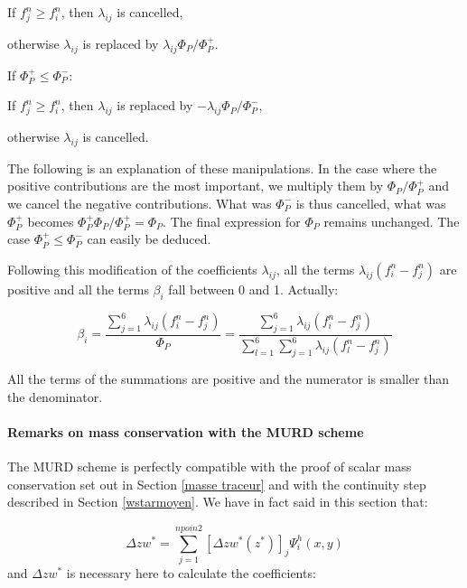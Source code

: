\qquad If $f_{j}^{n}\geq f_{i}^{n}$, then $\lambda_{ij}$ is cancelled,

\qquad otherwise $\lambda_{ij}$ is replaced by $\lambda_{ij}\Phi_{P}/\Phi_{P}^{+}$.

If $\Phi_{P}^{+}\leq\Phi_{P}^{-}$:

\qquad If $f_{j}^{n}\geq f_{i}^{n}$, then $\lambda_{ij}$ is replaced by
$-\lambda_{ij}\Phi_{P}/\Phi_{P}^{-}$,

\qquad otherwise $\lambda_{ij}$ is cancelled.

The following is an explanation of these manipulations. In the case where the
positive contributions are the most important, we multiply them by $\Phi_{P}/\Phi_{P}^{+}$
and we cancel the negative contributions. What was $\Phi_{P}^{-}$ is thus cancelled,
what was $\Phi_{P}^{+}$ becomes $\Phi _{P}^{+}\Phi_{P}/\Phi_{P}^{+}=\Phi_{P}$. The final expression for
$\Phi_{P}$ remains unchanged. The case $\Phi_{P}^{+}\leq\Phi_{P}^{-}$ can
easily be deduced.

Following this modification of the coefficients $\lambda_{ij}$, all the terms
$\lambda_{ij}(f_{i}^{n}-f_{j}^{n})$ are positive and all the terms $\beta_{i}$
fall between 0 and 1. Actually:%

\begin{equation}
\beta_{i}=\dfrac{\sum\limits_{j=1}^{6}\lambda_{ij}(f_{i}^{n}-f_{j}^{n})}%
{\Phi_{P}}=\dfrac{\sum\limits_{j=1}^{6}\lambda_{ij}(f_{i}^{n}-f_{j}^{n})}%
{\sum\limits_{l=1}^{6}\sum\limits_{j=1}^{6}\lambda_{ij}(f_{l}^{n}-f_{j}^{n})}%
\end{equation}


All the terms of the summations are positive and the numerator is smaller than
the denominator.

\paragraph{\label{murdconservation}Remarks on mass conservation with the
MURD scheme}

The MURD scheme is perfectly compatible with the proof of scalar mass
conservation set out in Section \ref{masse traceur} and with the continuity
step described in Section \ref{wstarmoyen}. We have in fact said in this
section that:%

\begin{equation}
\Delta zw^{\ast}=\sum\limits_{j=1}^{npoin2}\left[  \Delta zw^{\ast}(z^{\ast
})\right]  _{j}\Psi_{i}^{h}(x,y)
\end{equation}
and $\Delta zw^{\ast}$ is necessary here to calculate the coefficients:%

